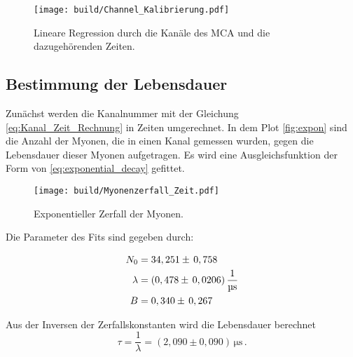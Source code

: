 \begin{figure}[H]
    \centering
    \texttt{[image: build/Channel\_Kalibrierung.pdf]}
    \caption{Lineare Regression durch die Kanäle des MCA und die dazugehörenden Zeiten.}
    \label{fig:lin_reg_Channel_zeit}
\end{figure}

\subsection{Bestimmung der Lebensdauer}
\label{sec:Bes_Leb}

Zunächst werden die Kanalnummer mit der Gleichung \autoref{eq:Kanal_Zeit_Rechnung} in Zeiten umgerechnet.
In dem Plot \autoref{fig:expon} sind die Anzahl der Myonen, die in einen Kanal gemessen wurden, gegen die Lebensdauer dieser Myonen aufgetragen.
Es wird eine Ausgleichsfunktion der Form von \autoref{eq:exponential_decay} gefittet.

\begin{figure}[H]
    \centering
    \texttt{[image: build/Myonenzerfall\_Zeit.pdf]}
    \caption{Exponentieller Zerfall der Myonen.}
    \label{fig:expon}
\end{figure}

Die Parameter des Fits sind gegeben durch:

\begin{align*}
    N_0         &=34,251  \pm \, 0,758                                 \\
    \lambda     &= (0,478 \pm \, 0,0206)  \, \unit{\dfrac{1}{\micro\second}} \\
    B           &=0,340   \pm \, 0,267
\end{align*}

Aus der Inversen der Zerfallskonstanten wird die Lebensdauer berechnet
\begin{equation*}
    \tau = \dfrac{1}{\lambda} = \left(2,090  \pm 0,090 \right) \,\unit{\micro\second} \,.
\end{equation*}

